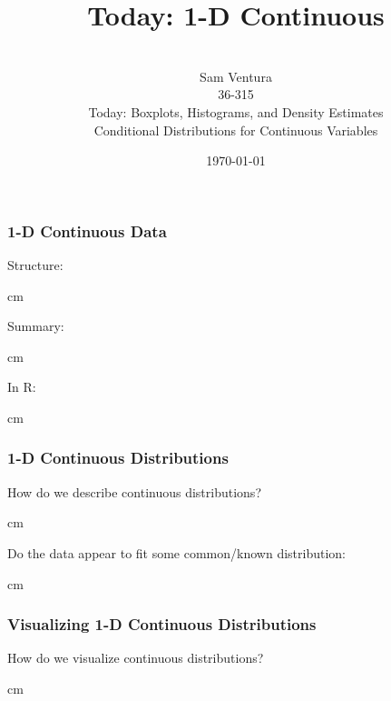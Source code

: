 \documentclass{beamer} %
\begin{document}
\title[dedup]{Today:  1-D Continuous}


\author[Samuel L. Ventura]{\\
  \large{Sam Ventura\\36-315\\Today:  Boxplots, Histograms, and Density Estimates\\Conditional Distributions for Continuous Variables}}
\date{\today}


\begin{frame}
	\maketitle
	
\end{frame}




\begin{frame}\frametitle{1-D Continuous Data}
	\small
	Structure:
	
	 cm
	
	Summary:
	
	 cm
	
	In R:  
	
	 cm
	
\end{frame}




\begin{frame}\frametitle{1-D Continuous Distributions}
	\small
	How do we describe continuous distributions?
	
	 cm
	
	Do the data appear to fit some common/known distribution:
	
	 cm
	
\end{frame}






\begin{frame}\frametitle{Visualizing 1-D Continuous Distributions}
	\small
	How do we visualize continuous distributions?
	
	 cm
	
\end{frame}
\end{document}
